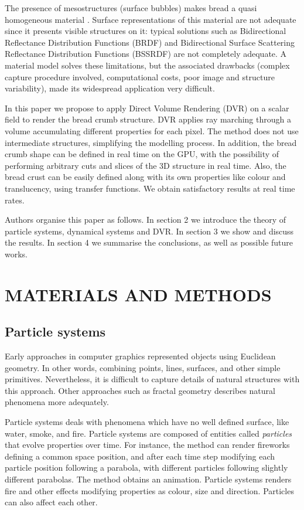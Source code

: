 \documentclass[oneside,a4paper,english,links]{amca}
\begin{document}
The presence of mesostructures (surface bubbles) makes bread a quasi homogeneous material \citep{Tong2005}. Surface representations
of this material are not adequate since it presents visible structures on it: typical solutions such as
Bidirectional Reflectance Distribution Functions (BRDF)
\citep{Kurt2009} and Bidirectional Surface Scattering Reflectance
Distribution Functions (BSSRDF) \citep{Donner2009} are not completely
adequate. A material model \citep{Tong2005} solves these limitations, but the associated drawbacks (complex capture procedure
involved, computational costs, poor image and structure variability),
made its widespread application very difficult.

In this paper we propose to apply Direct Volume Rendering (DVR)
\citep{Levoy1988,Kruger2003, Kratz2006} on a scalar field to render
the bread crumb structure. DVR applies ray marching through a volume
accumulating different properties for each pixel. The method does not
use intermediate structures, simplifying the modelling
process. In addition, the bread crumb shape can be defined in
real time on the GPU, with the possibility of performing arbitrary cuts and
slices of the 3D structure in real time. Also, the
bread crust can be easily defined along with its own properties like
colour and translucency, using transfer functions. We obtain satisfactory results at real time rates.

Authors organise this paper as follows. In section 2 we introduce the theory of
particle systems, dynamical systems and DVR. In section
3 we show and discuss the results. In section 4 we summarise the conclusions,
as well as possible future works.

\section{MATERIALS AND METHODS}

\subsection{Particle systems}

Early approaches in computer graphics represented objects using Euclidean geometry. In other words, combining points, lines, surfaces, and other simple primitives. Nevertheless, it is difficult to capture details of natural structures with this approach. Other approaches such as fractal geometry \citep{Mandelbrot83} describes natural phenomena more adequately.

Particle systems \citep{Reeves83} deals with phenomena which have no well defined surface, like water,
smoke, and fire. Particle systems are composed of entities called {\em
  particles} that evolve properties over time. For instance, the method can render fireworks defining a common space position, and after
each time step modifying each particle position following a parabola, with different
particles following slightly different parabolas. The method obtains an animation. Particle systems renders fire and other effects modifying properties as colour, size and direction. Particles can also affect each other.
\end{document}
